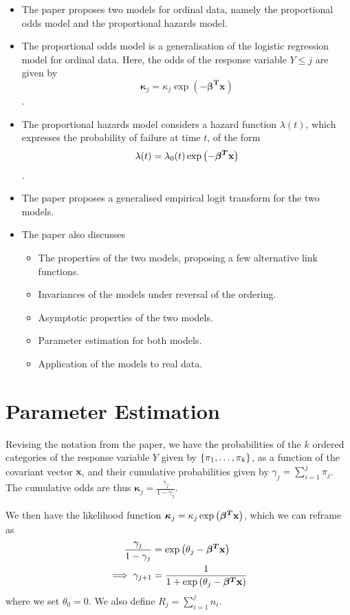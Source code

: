 \documentclass[reqno]{amsart}
\begin{document}
    \begin{itemize}
        \item The paper proposes two models for ordinal data, namely the proportional odds model and the proportional hazards model.
        \item The proportional odds model is a generalisation of the logistic regression model for ordinal data. Here, the odds of the response variable \(Y \leq j\) are given by \[\mathbf{\kappa}_j = \kappa_j \exp (- \boldsymbol{\beta^T} \mathbf{x})\].
        \item The proportional hazards model considers a hazard function \(\lambda(t)\), which expresses the probability of failure at time \(t\), of the form \[\lambda(t) = \lambda_0(t) \exp \left(- \boldsymbol{\beta^T} \mathbf{x}\right)\].
        \item The paper proposes a generalised empirical logit transform for the two models.
        \item The paper also discusses \begin{itemize}
            \item The properties of the two models, proposing a few alternative link functions.
            \item Invariances of the models under reversal of the ordering.
            \item Asymptotic properties of the two models.
            \item Parameter estimation for both models.
            \item Application of the models to real data.
        \end{itemize} 
    \end{itemize}

    \section{Parameter Estimation}

    Revising the notation from the paper, we have the probabilities of the \(k\) ordered categories of the response variable \(Y\) given by \(\left\{\pi_1, \ldots, \pi_{k}\right\}\), as a function of the covariant vector \(\mathbf{x}\), and their cumulative probabilities given by \(\displaystyle \gamma_j = \sum_{i = 1}^{j} \pi_j\). The cumulative odds are thus \(\boldsymbol{\kappa}_j = \frac{\gamma_j}{1 - \gamma_j}\).

    We then have the likelihood function \(\boldsymbol{\kappa}_j = \kappa_j \exp \left(\boldsymbol{\beta^T}\mathbf{x}\right)\), which we can reframe as \begin{align}
        \begin{split}
            \frac{\gamma_j}{1 - \gamma_j} &= \exp \left(\theta_j - \boldsymbol{\beta^T}\mathbf{x}\right) \\
            \implies \gamma_{j + 1} &= \frac{1}{1 + \exp \left(\theta_j - \boldsymbol{\beta^T}\mathbf{x}\right)} 
        \end{split}
    \end{align}
    where we set \(\theta_0 = 0\).
    We also define \(\displaystyle R_j = \sum_{i = 1}^{j} n_i\).
\end{document}
